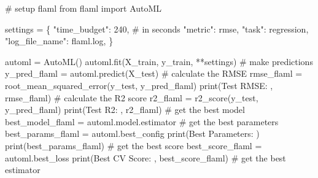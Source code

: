 \documentclass[
  letterpaper,
  DIV=11,
  numbers=noendperiod]{scrreprt}
\newenvironment{Shaded}{\begin{snugshade}}{\end{snugshade}}
\newcommand{\BuiltInTok}[1]{\textcolor[rgb]{0.00,0.23,0.31}{#1}}
\newcommand{\CommentTok}[1]{\textcolor[rgb]{0.37,0.37,0.37}{#1}}
\newcommand{\DecValTok}[1]{\textcolor[rgb]{0.68,0.00,0.00}{#1}}
\newcommand{\ImportTok}[1]{\textcolor[rgb]{0.00,0.46,0.62}{#1}}
\newcommand{\NormalTok}[1]{\textcolor[rgb]{0.00,0.23,0.31}{#1}}
\newcommand{\OperatorTok}[1]{\textcolor[rgb]{0.37,0.37,0.37}{#1}}
\newcommand{\StringTok}[1]{\textcolor[rgb]{0.13,0.47,0.30}{#1}}
\begin{document}
\begin{Shaded}
\begin{Highlighting}[]
\CommentTok{\# setup flaml}
\ImportTok{from}\NormalTok{ flaml }\ImportTok{import}\NormalTok{ AutoML}

\NormalTok{settings }\OperatorTok{=}\NormalTok{ \{}
    \StringTok{"time\_budget"}\NormalTok{: }\DecValTok{240}\NormalTok{,  }\CommentTok{\# in seconds}
    \StringTok{"metric"}\NormalTok{: }\StringTok{\textquotesingle{}rmse\textquotesingle{}}\NormalTok{,}
    \StringTok{"task"}\NormalTok{: }\StringTok{\textquotesingle{}regression\textquotesingle{}}\NormalTok{,}
    \StringTok{"log\_file\_name"}\NormalTok{: }\StringTok{\textquotesingle{}flaml.log\textquotesingle{}}\NormalTok{,}
\NormalTok{\}}

\NormalTok{automl }\OperatorTok{=}\NormalTok{ AutoML()}
\NormalTok{automl.fit(X\_train, y\_train, }\OperatorTok{**}\NormalTok{settings)}
\CommentTok{\# make predictions}
\NormalTok{y\_pred\_flaml }\OperatorTok{=}\NormalTok{ automl.predict(X\_test)}
\CommentTok{\# calculate the RMSE}
\NormalTok{rmse\_flaml }\OperatorTok{=}\NormalTok{ root\_mean\_squared\_error(y\_test, y\_pred\_flaml)}
\BuiltInTok{print}\NormalTok{(}\StringTok{\textquotesingle{}Test RMSE: \textquotesingle{}}\NormalTok{, rmse\_flaml)}
\CommentTok{\# calculate the R2 score}
\NormalTok{r2\_flaml }\OperatorTok{=}\NormalTok{ r2\_score(y\_test, y\_pred\_flaml)}
\BuiltInTok{print}\NormalTok{(}\StringTok{\textquotesingle{}Test R2: \textquotesingle{}}\NormalTok{, r2\_flaml)}
\CommentTok{\# get the best model}
\NormalTok{best\_model\_flaml }\OperatorTok{=}\NormalTok{ automl.model.estimator}
\CommentTok{\# get the best parameters}
\NormalTok{best\_params\_flaml }\OperatorTok{=}\NormalTok{ automl.best\_config}
\BuiltInTok{print}\NormalTok{(}\StringTok{\textquotesingle{}Best Parameters: \textquotesingle{}}\NormalTok{)}
\BuiltInTok{print}\NormalTok{(best\_params\_flaml)}
\CommentTok{\# get the best score}
\NormalTok{best\_score\_flaml }\OperatorTok{=}\NormalTok{ automl.best\_loss}
\BuiltInTok{print}\NormalTok{(}\StringTok{\textquotesingle{}Best CV Score: \textquotesingle{}}\NormalTok{, best\_score\_flaml)}
\CommentTok{\# get the best estimator}
\end{Highlighting}
\end{Shaded}
\end{document}

